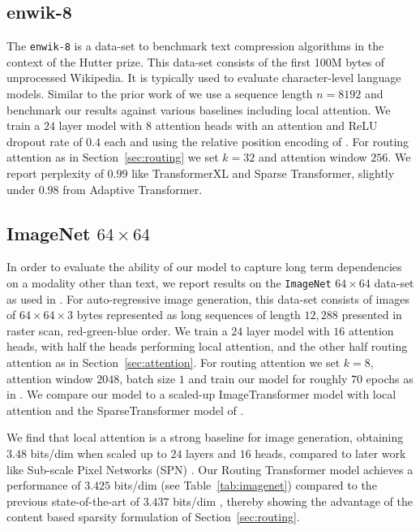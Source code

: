 \subsection{enwik-8}
The \texttt{enwik-8} \citep{mahoney2011large} is a data-set to benchmark text compression algorithms in the context of the Hutter prize. This data-set consists of the first 100M bytes of unprocessed Wikipedia. It is typically used to evaluate character-level language models. Similar to the prior work of \citet{dai2019transformer, child2019generating} we use a sequence length \(n = 8192\) and benchmark our results against various baselines including local attention. We train a \(24\) layer model with \(8\) attention heads with an attention and ReLU dropout rate of \(0.4\) each and using the relative position encoding of \citet{shaw2018self}. For routing attention as in Section~\ref{sec:routing} we set \(k = 32\) and attention window \(256\). We report perplexity of $0.99$ like TransformerXL and Sparse Transformer, slightly under $0.98$ from Adaptive Transformer. 

\subsection{ImageNet \(64\times 64\)}
In order to evaluate the ability of our model to capture long term dependencies on a modality other than text, we report results on the \texttt{ImageNet} \(64\times 64\) data-set as used in \citet{child2019generating}.
For auto-regressive image generation, this data-set consists of images of 
$64\times 64 \times 3$ bytes represented as long sequences of length $12,288$ presented in raster scan, red-green-blue order. We train a \(24\) layer model with \(16\) attention heads, with half the heads performing local attention, and the other half routing attention as in Section~\ref{sec:attention}. For routing attention we set \(k = 8\), attention window \(2048\), batch size \(1\) and train our model for roughly \(70\) epochs as in 
\citet{child2019generating}. We compare our model to a scaled-up ImageTransformer model with local attention \citep{parmar2018image} and the SparseTransformer model of \citet{child2019generating}.

We find that local attention \citep{parmar2018image} is a strong baseline for image generation, obtaining
\(3.48\) bits/dim when scaled up to \(24\) layers and \(16\) heads, compared to later work like Sub-scale Pixel Networks (SPN) \citep{menick2018generating}. Our Routing Transformer model achieves a performance of \(3.425\) bits/dim (see Table~\ref{tab:imagenet}) compared to the previous state-of-the-art of \(3.437\) bits/dim \citep{child2019generating}, thereby showing the advantage of the content based sparsity formulation of Section~\ref{sec:routing}.

